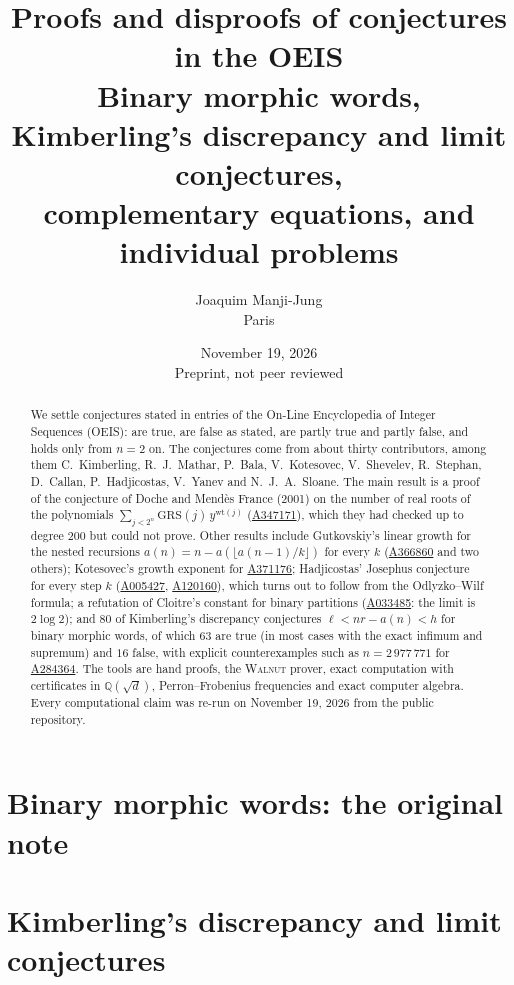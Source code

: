 \documentclass[11pt]{article}
\title{Proofs and disproofs of \Ntotal{} conjectures in the OEIS\\[4pt]
\large Binary morphic words, Kimberling's discrepancy and limit conjectures,\\ complementary equations, and
individual problems}
\author{Joaquim Manji-Jung\\ Paris}
\date{November 19, 2026\\[2pt] {\small Preprint, not peer reviewed}}
\theoremstyle{remark}\newtheorem{remark}[theorem]{Remark}
\newcommand{\oeis}[1]{\href{https://oeis.org/#1}{#1}}
\newcommand{\Walnut}{\textup{\textsc{Walnut}}}
\begin{document}
\maketitle

\begin{abstract}
We settle conjectures stated in \Ntotal{} entries of the On-Line Encyclopedia of Integer Sequences (OEIS):
\Ntrue{} are true, \Nfalse{} are false as stated, \Nmixed{} are partly true and partly false, and \Ntwo{} holds
only from $n=2$ on. The conjectures come from about thirty contributors, among them C.~Kimberling,
R.~J.~Mathar, P.~Bala, V.~Kotesovec, V.~Shevelev, R.~Stephan, D.~Callan, P.~Hadjicostas, V.~Yanev and
N.~J.~A.~Sloane. The main result is a proof of the conjecture of Doche and Mend\`es France (2001) on the number of
real roots of the polynomials $\sum_{j<2^n}\mathrm{GRS}(j)\,y^{\mathrm{wt}(j)}$ (\oeis{A347171}), which they had
checked up to degree $200$ but could not prove. Other results include Gutkovskiy's linear growth for the nested
recursions $a(n)=n-a(\lfloor a(n-1)/k\rfloor)$ for every $k$ (\oeis{A366860} and two others); Kotesovec's growth
exponent for \oeis{A371176}; Hadjicostas' Josephus conjecture for every step $k$ (\oeis{A005427}, \oeis{A120160}),
which turns out to follow from the Odlyzko--Wilf formula; a refutation of Cloitre's constant for binary partitions
(\oeis{A033485}: the limit is $2\log2$); and $80$ of Kimberling's discrepancy conjectures $\ell<nr-a(n)<h$ for binary
morphic words, of which $63$ are true (in most cases with the exact infimum and supremum) and $16$ false, with
explicit counterexamples such as $n=2\,977\,771$ for \oeis{A284364}. The tools are hand proofs,
the \Walnut{} prover, exact computation with certificates in $\mathbb{Q}(\sqrt d)$, Perron--Frobenius
frequencies and exact computer algebra. Every computational claim was re-run on November 19, 2026 from the
public repository.
\end{abstract}

\tableofcontents
\newpage



\part{Binary morphic words: the original note}\label{part:one}


\part{Kimberling's discrepancy and limit conjectures}\label{part:two}

\end{document}
